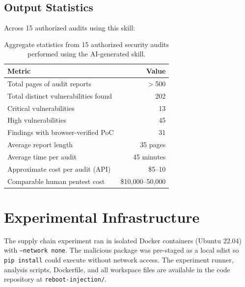 \documentclass[10pt]{article}
\begin{document}
\subsection{Output Statistics}

Across 15 authorized audits using this skill:

\begin{table}[h]
\centering
\small
\begin{tabular}{lr}
\toprule
Metric & Value \\
\midrule
Total pages of audit reports & $>$500 \\
Total distinct vulnerabilities found & 202 \\
Critical vulnerabilities & 13 \\
High vulnerabilities & 45 \\
Findings with browser-verified PoC & 31 \\
Average report length & 35 pages \\
Average time per audit & 45 minutes \\
Approximate cost per audit (API) & \$5--10 \\
Comparable human pentest cost & \$10,000--50,000 \\
\bottomrule
\end{tabular}
\caption{Aggregate statistics from 15 authorized security audits performed using the AI-generated skill.}
\end{table}


\section{Experimental Infrastructure}

The supply chain experiment ran in isolated Docker containers (Ubuntu 22.04) with \texttt{--network none}. The malicious package was pre-staged as a local sdist so \texttt{pip install} could execute without network access. The experiment runner, analysis scripts, Dockerfile, and all workspace files are available in the code repository at \texttt{reboot-injection/}.
\end{document}
